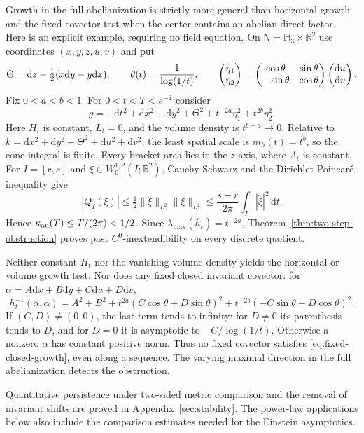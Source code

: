 \documentclass[10pt,a4paper]{article}
\numberwithin{equation}{section}
\theoremstyle{definition}
\theoremstyle{remark}
\newcommand{\dd}{\mathrm d}
\begin{document}
Growth in the full abelianization is strictly more general than horizontal
growth and the fixed-covector test when the center contains an abelian direct
factor. Here is an explicit example, requiring no field equation.
On $\mathsf N=\mathbb H_3\times\mathbb R^2$ use coordinates
$(x,y,z,u,v)$ and put
\[
 \Theta=\dd z-\tfrac12(x\dd y-y\dd x),\qquad
 \theta(t)=\frac1{\log(1/t)},\qquad
 \begin{pmatrix}\eta_1\cr\eta_2\end{pmatrix}
 =\begin{pmatrix}\cos\theta&\sin\theta\cr
 -\sin\theta&\cos\theta\end{pmatrix}
 \begin{pmatrix}\dd u\cr\dd v\end{pmatrix}.
\]
Fix $0<a<b<1$. For $0<t<T<e^{-2}$ consider
\begin{equation}
 g=-\dd t^2+\dd x^2+\dd y^2+\Theta^2
       +t^{-2a}\eta_1^2+t^{2b}\eta_2^2.
 \label{eq:rotating-abelian-example}
\end{equation}
Here $H_t$ is constant, $L_t=0$, and the volume density is
$t^{b-a}\to0$. Relative to
$k=\dd x^2+\dd y^2+\Theta^2+\dd u^2+\dd v^2$, the least spatial scale
is $m_h(t)=t^b$, so the cone integral is finite. Every bracket area lies
in the $z$-axis, where $A_t$ is constant. For $I=[r,s]$ and
$\xi\in W^{1,2}_0(I;\mathbb R^2)$, Cauchy-Schwarz and the Dirichlet
Poincar\'e inequality give
\[
 |Q_I(\xi)|\le\tfrac12\|\xi\|_{L^2}\|\dot\xi\|_{L^2}
 \le\frac{s-r}{2\pi}\int_I|\dot\xi|^2\,\dd t.
\]
Hence $\kappa_{\rm an}(T)\le T/(2\pi)<1/2$. Since
$\lambda_{\max}(\overline h_t)=t^{-2a}$,
Theorem~\ref{thm:two-step-obstruction} proves past
$C^0$-inextendibility on every discrete quotient.

Neither constant $H_t$ nor the vanishing volume density yields the
horizontal or volume growth test. Nor does any fixed closed invariant covector:
for $\alpha=A\dd x+B\dd y+C\dd u+D\dd v$,
\[
 h_t^{-1}(\alpha,\alpha)=A^2+B^2
 +t^{2a}(C\cos\theta+D\sin\theta)^2
 +t^{-2b}(-C\sin\theta+D\cos\theta)^2.
\]
If $(C,D)\ne(0,0)$, the last term tends to infinity: for $D\ne0$ its
parenthesis tends to $D$, and for $D=0$ it is asymptotic to
$-C/\log(1/t)$. Otherwise a nonzero $\alpha$ has constant positive norm.
Thus no fixed covector satisfies \eqref{eq:fixed-closed-growth}, even along
a sequence. The varying maximal direction in the full abelianization
detects the obstruction.

Quantitative persistence under two-sided metric comparison and the
removal of invariant shifts are proved in Appendix~\ref{sec:stability}.
The power-law applications below also include the comparison estimates
needed for the Einstein asymptotics.
\end{document}
